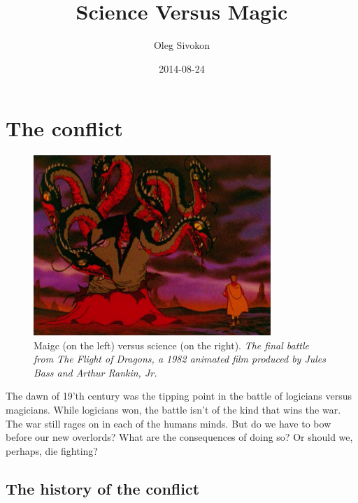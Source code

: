 \documentclass[11pt]{article}
\author{Oleg Sivokon}
\date{2014-08-24}
\title{Science Versus Magic}
\begin{document}
\maketitle
\tableofcontents


\newpage

\section{The conflict}
\label{sec-1}

\begin{figure}[h!]
  \centering
  \includegraphics[width=0.8\textwidth]{./the-flight-of-dragons.png}
  \caption[Magic vs Science]{
    \ssmall Maigc (on the left) versus science (on the right).
    \textit{The final battle from The Flight of Dragons,
      a 1982 animated film produced by Jules Bass and Arthur Rankin, Jr.}}
\end{figure}

The dawn of 19'th century was the tipping point in the battle of logicians
versus magicians.  While logicians won, the battle isn't of the kind that wins
the war.  The war still rages on in each of the humans minds.  But do we have
to bow before our new overlords?  What are the consequences of doing so?
Or should we, perhaps, die fighting?

\subsection{The history of the conflict}
\label{sec-1-1}
\end{document}
